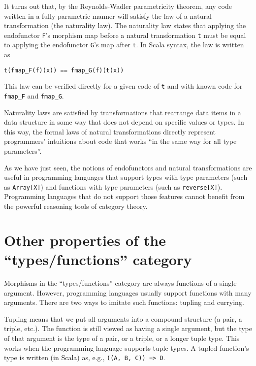 It turns out that, by the Reynolds-Wadler parametricity theorem, any
code written in a fully parametric manner will satisfy the law of
a natural transformation (the naturality law). The naturality law
states that applying the endofunctor \lstinline!F!\textsf{'}s morphism map
before a natural transformation \lstinline!t! must be equal to applying
the endofunctor \lstinline!G!\textsf{'}s map after \lstinline!t!. In Scala
syntax, the law is written as
\begin{lstlisting}
t(fmap_F(f)(x)) == fmap_G(f)(t(x))
\end{lstlisting}
This law can be verified directly for a given code of \lstinline!t!
and with known code for \lstinline!fmap_F! and \lstinline!fmap_G!.

Naturality laws are satisfied by transformations that rearrange data
items in a data structure in some way that does not depend on specific
values or types. In this way, the formal laws of natural transformations
directly represent programmers\textsf{'} intuitions about code that works \textsf{``}in
the same way for all type parameters\textsf{''}.

As we have just seen, the notions of endofunctors and natural transformations
are useful in programming languages that support types with type parameters
(such as \lstinline!Array[X]!) and functions with type parameters
(such as \lstinline!reverse[X]!). Programming languages that do not
support those features cannot benefit from the powerful reasoning
tools of category theory.

\section{Other properties of the \textquotedblleft types/functions\textquotedblright{}
category}

Morphisms in the \textsf{``}types/functions\textsf{''} category are always functions
of a single argument. However, programming languages usually support
functions with many arguments. There are two ways to imitate such
functions: tupling and currying.

Tupling means that we put all arguments into a compound structure
(a pair, a triple, etc.). The function is still viewed as having a
single argument, but the type of that argument is the type of a pair,
or a triple, or a longer tuple type. This works when the programming
language supports tuple types. A tupled function\textsf{'}s type is written
(in Scala) as, e.g., \lstinline!((A, B, C)) => D!.

